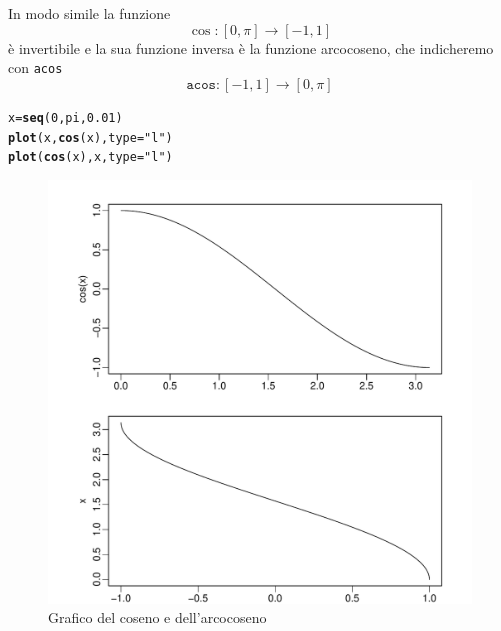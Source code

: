 \documentclass[onecolumn,11pt]{book}\usepackage[]{graphicx}\usepackage[]{color}
\makeatletter
\def\maxwidth{ %
  \ifdim\Gin@nat@width>\linewidth
    \linewidth
  \else
    \Gin@nat@width
  \fi
}
\newcommand{\hlnum}[1]{\textcolor[rgb]{0.686,0.059,0.569}{#1}}%
\newcommand{\hlstr}[1]{\textcolor[rgb]{0.192,0.494,0.8}{#1}}%
\newcommand{\hlstd}[1]{\textcolor[rgb]{0.345,0.345,0.345}{#1}}%
\newcommand{\hlkwb}[1]{\textcolor[rgb]{0.69,0.353,0.396}{#1}}%
\newcommand{\hlkwc}[1]{\textcolor[rgb]{0.333,0.667,0.333}{#1}}%
\newcommand{\hlkwd}[1]{\textcolor[rgb]{0.737,0.353,0.396}{\textbf{#1}}}%
\newenvironment{kframe}{%
 \def\at@end@of@kframe{}%
 \ifinner\ifhmode%
  \def\at@end@of@kframe{\end{minipage}}%
  \begin{minipage}{\columnwidth}%
 \fi\fi%
 \def\FrameCommand##1{\hskip\@totalleftmargin \hskip-\fboxsep
 \colorbox{shadecolor}{##1}\hskip-\fboxsep
     \hskip-\linewidth \hskip-\@totalleftmargin \hskip\columnwidth}%
 \MakeFramed {\advance\hsize-\width
   \@totalleftmargin\z@ \linewidth\hsize
   \@setminipage}}%
 {\par\unskip\endMakeFramed%
 \at@end@of@kframe}
\newenvironment{knitrout}{}{} %
\makeatother
\begin{document}
In modo simile la funzione
$$\cos\colon [0,\pi]\rightarrow [-1,1]$$
 \`e invertibile e la sua funzione inversa \`e  la funzione arcocoseno, che indicheremo con \texttt{acos}
$$\texttt{acos}\colon  [-1,1]\rightarrow [0,\pi]$$
\begin{knitrout}
\color{fgcolor}\begin{kframe}
\begin{alltt}
\hlstd{x}\hlkwb{=}\hlkwd{seq}\hlstd{(}\hlnum{0}\hlstd{,pi,}\hlnum{0.01}\hlstd{)}
\hlkwd{plot}\hlstd{(x,}\hlkwd{cos}\hlstd{(x),}\hlkwc{type}\hlstd{=}\hlstr{"l"}\hlstd{)}
\hlkwd{plot}\hlstd{(}\hlkwd{cos}\hlstd{(x),x,}\hlkwc{type}\hlstd{=}\hlstr{"l"}\hlstd{)}
\end{alltt}
\end{kframe}
\end{knitrout}
\begin{center}\begin{figure}

\begin{knitrout}
\color{fgcolor}
\includegraphics[width=\maxwidth]{figure/unnamed-chunk-103-1} 

\end{knitrout}
\caption{Grafico del coseno e dell'arcocoseno}
\end{figure}

\end{center}
\end{document}
